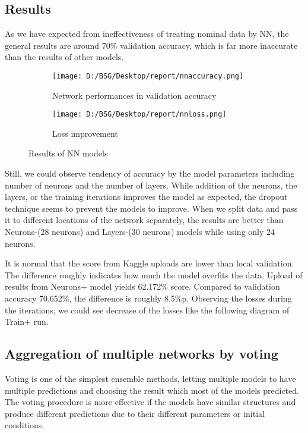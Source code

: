 \documentclass{article}
\begin{document}
\subsection{Results}
As we have expected from ineffectiveness of treating nominal data by NN, the
general results are around 70\% validation accuracy, which is far more
inaccurate than the results of other models.
\begin{figure}[!h]
  \centering
\begin{subfigure}[h]{.50\textwidth}
  \texttt{[image: D:/BSG/Desktop/report/nnaccuracy.png]}
  \caption{Network performances in validation accuracy}
\end{subfigure}
\begin{subfigure}[h]{.47\textwidth}
  \texttt{[image: D:/BSG/Desktop/report/nnloss.png]}
  \caption{Loss improvement}
\end{subfigure}
  \caption{Results of NN models}
  \label{fig:nnresult}
\end{figure}

Still, we could observe tendency of accuracy by the model parameters including
number of neurons and the number of layers. While addition of the neurons, the
layers, or the training iterations improves the model as expected, the dropout
technique seems to prevent the models to improve. When we split data and pass it
to different locations of the network separately, the results are better than
Neurons-(28 neurons) and Layers-(30 neurons) models while using only 24 neurons.

It is normal that the score from Kaggle uploads are lower than local validation.
The difference roughly indicates how much the model overfits the data. Upload of
results from Neurons+ model yields 62.172\% score. Compared to validation
accuracy 70.652\%, the difference is roughly 8.5\%p.
Observing the losses during the iterations, we could see decrease of the losses
like the following diagram of Train+ run.

\subsection{Aggregation of multiple networks by voting}
Voting is one of the simplest ensemble methods, letting multiple models to have
multiple predictions and choosing the result which most of the models predicted.
The voting procedure is more effective if the models have similar structures and
produce different predictions due to their different parameters or initial
conditions.\cite{alpaydin1992multiple}
\end{document}
